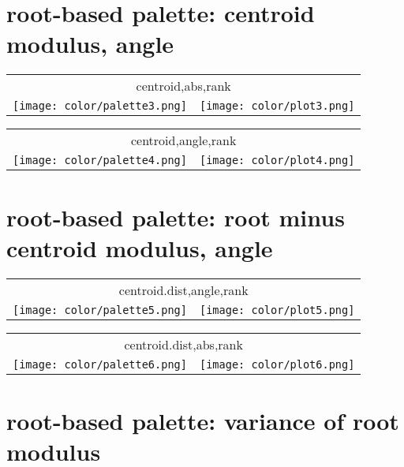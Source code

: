 \documentclass{article}
\begin{document}
\newpage
\section{root-based palette: centroid modulus, angle}

\begin{center}
\begin{tabular}{m{8cm}m{8cm}}
\multicolumn{2}{c}{centroid,abs,rank} \\
\texttt{[image: color/palette3.png]} &
\texttt{[image: color/plot3.png]}
\end{tabular}
\end{center}

\begin{center}
\begin{tabular}{m{8cm}m{8cm}}
\multicolumn{2}{c}{centroid,angle,rank} \\
\texttt{[image: color/palette4.png]} &
\texttt{[image: color/plot4.png]}
\end{tabular}
\end{center}

\newpage
\section{root-based palette: root minus centroid modulus, angle}

\begin{center}
\begin{tabular}{m{8cm}m{8cm}}
\multicolumn{2}{c}{centroid.dist,angle,rank} \\
\texttt{[image: color/palette5.png]} &
\texttt{[image: color/plot5.png]}
\end{tabular}
\end{center}

\begin{center}
\begin{tabular}{m{8cm}m{8cm}}
\multicolumn{2}{c}{centroid.dist,abs,rank} \\
\texttt{[image: color/palette6.png]} &
\texttt{[image: color/plot6.png]}
\end{tabular}
\end{center}

\newpage
\section{root-based palette: variance of root modulus}
\end{document}
